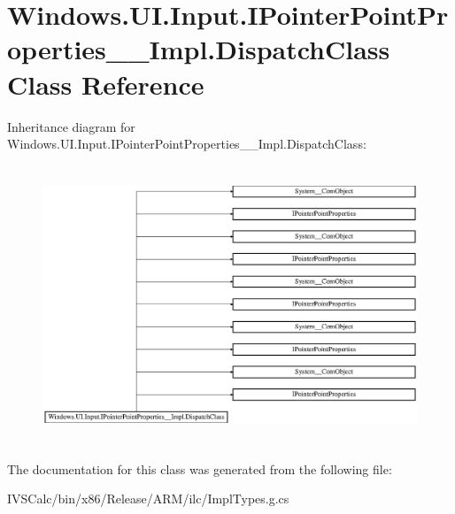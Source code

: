 \hypertarget{class_windows_1_1_u_i_1_1_input_1_1_i_pointer_point_properties_____impl_1_1_dispatch_class}{}\section{Windows.\+U\+I.\+Input.\+I\+Pointer\+Point\+Properties\+\_\+\+\_\+\+Impl.\+Dispatch\+Class Class Reference}
\label{class_windows_1_1_u_i_1_1_input_1_1_i_pointer_point_properties_____impl_1_1_dispatch_class}
Inheritance diagram for Windows.\+U\+I.\+Input.\+I\+Pointer\+Point\+Properties\+\_\+\+\_\+\+Impl.\+Dispatch\+Class\+:\begin{figure}[H]
\begin{center}
\leavevmode
\includegraphics[height=8.346883cm]{class_windows_1_1_u_i_1_1_input_1_1_i_pointer_point_properties_____impl_1_1_dispatch_class}
\end{center}
\end{figure}


The documentation for this class was generated from the following file\+:\begin{DoxyCompactItemize}
\item 
I\+V\+S\+Calc/bin/x86/\+Release/\+A\+R\+M/ilc/Impl\+Types.\+g.\+cs\end{DoxyCompactItemize}

